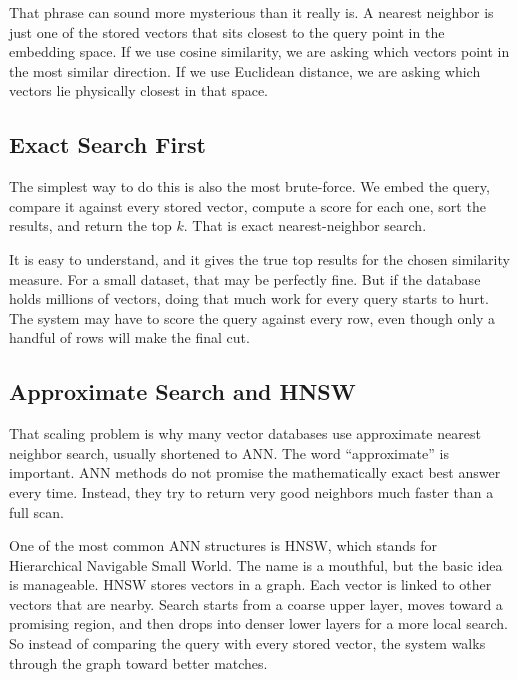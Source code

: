 \documentclass[12pt]{article}
\begin{document}
That phrase can sound more mysterious than it really is. A nearest
neighbor is just one of the stored vectors that sits closest to the query
point in the embedding space. If we use cosine similarity, we are asking
which vectors point in the most similar direction. If we use Euclidean
distance, we are asking which vectors lie physically closest in that
space.

\subsection{Exact Search First}

The simplest way to do this is also the most brute-force. We embed the
query, compare it against every stored vector, compute a score for each
one, sort the results, and return the top $k$. That is exact
nearest-neighbor search.

It is easy to understand, and it gives the true top results for the
chosen similarity measure. For a small dataset, that may be perfectly
fine. But if the database holds millions of vectors, doing that much work
for every query starts to hurt. The system may have to score the query
against every row, even though only a handful of rows will make the final
cut.

\subsection{Approximate Search and HNSW}

That scaling problem is why many vector databases use approximate nearest
neighbor search, usually shortened to ANN. The word ``approximate'' is
important. ANN methods do not promise the mathematically exact best answer
every time. Instead, they try to return very good neighbors much faster
than a full scan.

One of the most common ANN structures is HNSW, which stands for
Hierarchical Navigable Small World. The name is a mouthful, but the basic
idea is manageable. HNSW stores vectors in a graph. Each vector is linked
to other vectors that are nearby. Search starts from a coarse upper layer,
moves toward a promising region, and then drops into denser lower layers
for a more local search. So instead of comparing the query with every
stored vector, the system walks through the graph toward better matches.
\end{document}
